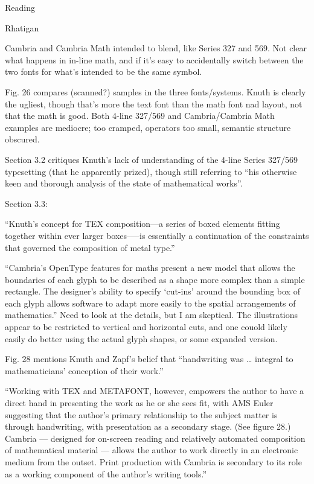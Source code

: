 \documentclass[11pt]{PalisadesLakesBook}
\begin{document}
\begin{plSection}{Reading}
\begin{plSection}{Rhatigan}
\begin{plSection}{}
\begin{plSection}{}
Cambria and Cambria Math intended to blend, 
like Series 327 and 569.
Not clear what happens in in-line math,
and if it's easy to accidentally switch
between the two fonts for what's intended to be the same symbol.

Fig. 26 compares (scanned?) samples in the three fonts/systems.
Knuth is clearly the ugliest, though that's more the text font
than the math font nad layout, not that the math is good.
Both 4-line 327/569 and Cambria/Cambria Math examples
are mediocre; too cramped, operators too small, semantic structure
obscured.

Section 3.2 critiques Knuth's lack of understanding of the 4-line
Series 327/569 typesetting (that he apparently prized),
though still referring to 
``his otherwise keen and thorough analysis 
of the state of mathematical works''.

Section 3.3:

``Knuth’s concept for TEX composition---a series of boxed elements 
fitting together within ever larger boxes--—is essentially 
a continuation of the constraints that governed 
the composition of metal type.''

``Cambria’s OpenType features for maths present a new model 
that allows the boundaries of each glyph to be described 
as a shape more complex than a simple rectangle. 
The designer’s ability to specify ‘cut-ins’ 
around the bounding box of each glyph allows software 
to adapt more easily to the spatial arrangements of mathematics.''
Need to look at the details, but I am skeptical.
The illustrations appear to be restricted to vertical and
horizontal cuts, and one couold likely easily do better using
the actual glyph shapes, or some expanded version.

Fig. 28 mentions Knuth and Zapf's belief that 
``handwriting was {\ldots} integral 
to mathematicians’ conception of their work.''

``Working with TEX and METAFONT, 
however, empowers the author to have a direct hand 
in presenting the work as he or she sees fit, 
with AMS Euler suggesting that the author’s primary relationship 
to the subject matter is through handwriting, 
with presentation as a secondary stage. (See figure 28.) 
Cambria — designed for on-screen reading 
and relatively automated composition of mathematical 
material — allows the author to work directly 
in an electronic medium from the outset. 
Print production with Cambria is secondary to its role 
as a working component of the author’s writing tools.''


\end{plSection}
\end{plSection}
\end{plSection}
\end{plSection}
\end{document}

